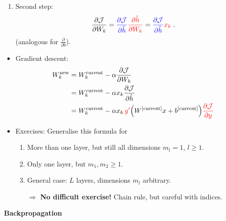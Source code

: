\documentclass[10pt,hyperref={pdfpagelabels=false}]{beamer}
\begin{document}
\begin{frame}[allowframebreaks]
\begin{minipage}{.6\textwidth}
{\begin{itemize}
\begin{enumerate}
$$                \;.
                $$
                \item Second step:
                $$
                \frac{\partial\mathcal{J}}{\partial W_k} =
                {\color{blue}\frac{\partial\mathcal{J}}{\partial \hat{h}}}
                {\color{red}
                \frac{\partial \hat{h}}{\partial W_k}
                }=
                {\color{blue}\frac{\partial\mathcal{J}}{\partial \hat{h}}}
                {\color{red}
                x_k
                }
                \;.
                $$
                (analogous for $\frac{\partial}{\partial b}$).
            \end{enumerate}
        \end{itemize}
        }
    \end{minipage}
    \begin{minipage}{.3\textwidth}
        
    \end{minipage}
    \framebreak
    \begin{itemize}
        \item Gradient descent:
        \begin{equation*}
            \begin{split}
                W_k^{\text{new}} &=
                W_k^{\text{current}} -
                \learningrate \frac{\partial\loss}{\partial W_k}\\
                &= W^{\text{current}}_k -
                \learningrate x_k \frac{\partial\loss}{\partial \hat{h}}\\
                &= W^{\text{current}}_k -
                \learningrate x_k\, {\color{red}g'}\left(W^{[\text{current}]}x+b^{[\text{current}]}\right)
                {\color{red}\frac{\partial\loss}{\partial y}}
            \end{split}
        \end{equation*}
        \item Exercises: Generalise this formula for
        \begin{enumerate}
            \item More than one layer, but still all dimensions $m_l=1$, $l\geq 1$.
            \item Only one layer, but $m_1, m_2\geq 1$.
            \item General case: $L$ layers, dimensions $m_l$ arbitrary.
            \item[$\Rightarrow$] {\bf No difficult exercise!} Chain rule, but careful with indices.
        \end{enumerate}
    \end{itemize}
    \begin{center}
    {\huge {\bf Backpropagation}}
    \end{center}
\end{frame}
\end{document}
